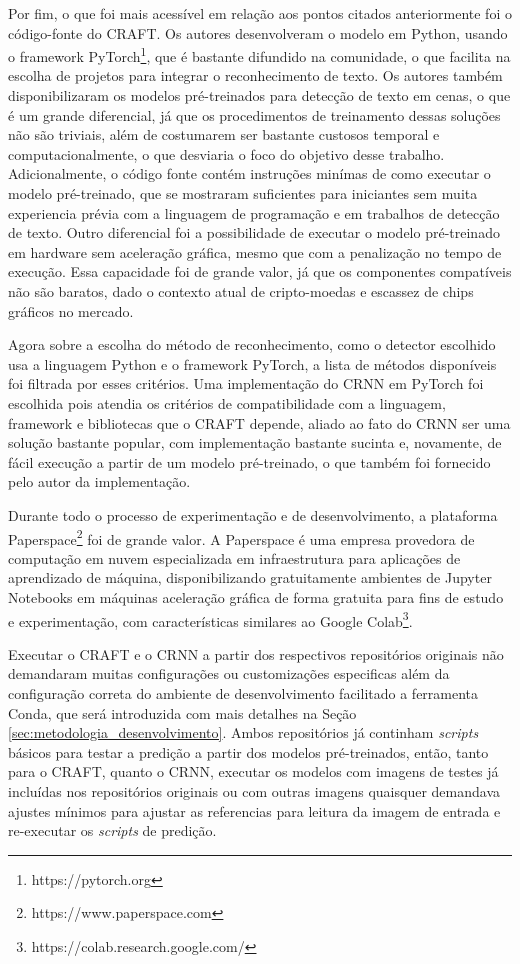 Por fim, o que foi mais acessível em relação aos pontos citados anteriormente foi o código-fonte do CRAFT. Os autores desenvolveram o modelo em Python, usando o framework PyTorch\footnote{https://pytorch.org}, que é bastante difundido na comunidade, o que facilita na escolha de projetos para integrar o reconhecimento de texto. Os autores também disponibilizaram os modelos pré-treinados para detecção de texto em cenas, o que é um grande diferencial, já que os procedimentos de treinamento dessas soluções não são triviais, além de costumarem ser bastante custosos temporal e computacionalmente, o que desviaria o foco do objetivo desse trabalho. Adicionalmente, o código fonte contém instruções minímas de como executar o modelo pré-treinado, que se mostraram suficientes para iniciantes sem muita experiencia prévia com a linguagem de programação e em trabalhos de detecção de texto. Outro diferencial foi a possibilidade de executar o modelo pré-treinado em hardware sem aceleração gráfica, mesmo que com a penalização no tempo de execução. Essa capacidade foi de grande valor, já que os componentes compatíveis não são baratos, dado o contexto atual de cripto-moedas e escassez de chips gráficos no mercado.

Agora sobre a escolha do método de reconhecimento, como o detector escolhido usa a linguagem Python e o framework PyTorch, a lista de métodos disponíveis foi filtrada por esses critérios. Uma implementação do CRNN em PyTorch foi escolhida pois atendia os critérios de compatibilidade com a linguagem, framework e bibliotecas que o CRAFT depende, aliado ao fato do CRNN ser uma solução bastante popular, com implementação bastante sucinta e, novamente, de fácil execução a partir de um modelo pré-treinado, o que também foi fornecido pelo autor da implementação.

Durante todo o processo de experimentação e de desenvolvimento, a plataforma Paperspace\footnote{https://www.paperspace.com} foi de grande valor. A Paperspace é uma empresa provedora de computação em nuvem especializada em infraestrutura para aplicações de aprendizado de máquina, disponibilizando gratuitamente ambientes de Jupyter Notebooks em máquinas aceleração gráfica de forma gratuita para fins de estudo e experimentação, com características similares ao Google Colab\footnote{https://colab.research.google.com/}.

Executar o CRAFT e o CRNN a partir dos respectivos repositórios originais não demandaram muitas configurações ou customizações especificas além da configuração correta do ambiente de desenvolvimento facilitado a ferramenta Conda, que será introduzida com mais detalhes na Seção \ref{sec:metodologia_desenvolvimento}. Ambos repositórios já continham \textit{scripts} básicos para testar a predição a partir dos modelos pré-treinados, então, tanto para o CRAFT, quanto o CRNN, executar os modelos com imagens de testes já incluídas nos repositórios originais ou com outras imagens quaisquer demandava ajustes mínimos para ajustar as referencias para leitura da imagem de entrada e re-executar os \textit{scripts} de predição.


